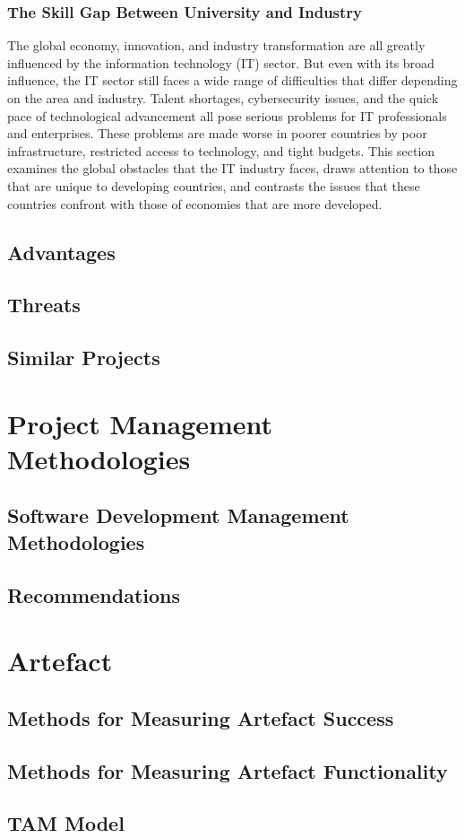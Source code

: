 \subsubsection{The Skill Gap Between University and Industry}
\par{The global economy, innovation, and industry transformation are all greatly influenced by the information technology (IT) sector. But even with its broad influence, the IT sector still faces a wide range of difficulties that differ depending on the area and industry. Talent shortages, cybersecurity issues, and the quick pace of technological advancement all pose serious problems for IT professionals and enterprises. These problems are made worse in poorer countries by poor infrastructure, restricted access to technology, and tight budgets. This section examines the global obstacles that the IT industry faces, draws attention to those that are unique to developing countries, and contrasts the issues that these countries confront with those of economies that are more developed.
}
\subsection{Advantages}
\subsection{Threats}
\subsection{Similar Projects}

\section{Project Management Methodologies}
\subsection{Software Development Management Methodologies}
\subsection{Recommendations}

\section{Artefact}
\subsection{Methods for Measuring Artefact Success}
\subsection{Methods for Measuring Artefact Functionality}
\subsection{TAM Model}